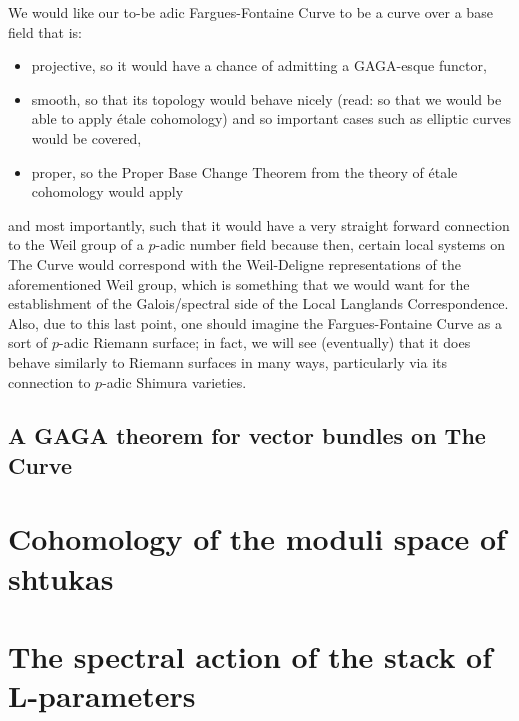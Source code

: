             We would like our to-be adic Fargues-Fontaine Curve to be a curve over a base field that is:
                \begin{itemize}
                    \item projective, so it would have a chance of admitting a GAGA-esque functor,
                    \item smooth, so that its topology would behave nicely (read: so that we would be able to apply \'etale cohomology) and so important cases such as elliptic curves would be covered, 
                    \item proper, so the Proper Base Change Theorem from the theory of \'etale cohomology would apply 
                \end{itemize}
            and most importantly, such that it would have a very straight forward connection to the Weil group of a $p$-adic number field because then, certain local systems on The Curve would correspond with the Weil-Deligne representations of the aforementioned Weil group, which is something that we would want for the establishment of the Galois/spectral side of the Local Langlands Correspondence. Also, due to this last point, one should imagine the Fargues-Fontaine Curve as a sort of $p$-adic Riemann surface; in fact, we will see (eventually) that it does behave similarly to Riemann surfaces in many ways, particularly via its connection to $p$-adic Shimura varieties.
        
        \subsection{A GAGA theorem for vector bundles on The Curve}
    
    \section{Cohomology of the moduli space of shtukas}
    
    \section{The spectral action of the stack of L-parameters}